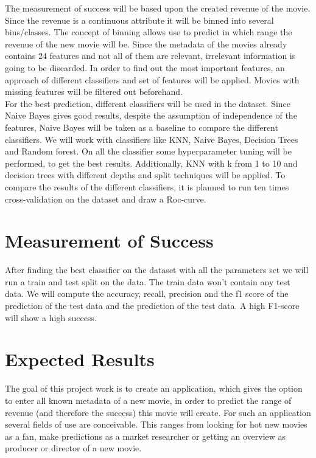 The measurement of success will be based upon the created revenue of the movie. Since the revenue is a continuous attribute it will be binned into several bins/classes. The concept of binning allows use to predict in which range the revenue of the new movie will be.
Since the metadata of the movies already contains 24 features and not all of them are relevant, irrelevant information is going to be discarded. In order to find out the most important features, an approach of different classifiers and set of features will be applied. Movies with missing features will be filtered out beforehand. \\
For the best prediction, different classifiers will be used in the dataset. Since Naive Bayes gives good results, despite the assumption of independence of the features, Naive Bayes will be taken as a baseline to compare the different classifiers. We will work with classifiers like KNN, Naive Bayes, Decision Trees and Random forest. On all the classifier some hyperparameter tuning will be performed, to get the best results. Additionally, KNN with k from 1 to 10 and decision trees with different depths and split techniques will be applied.
To compare the results of the different classifiers, it is planned to run ten times cross-validation on the dataset and draw a Roc-curve.


\section{Measurement of Success}
After finding the best classifier on the dataset with all the parameters set we will run a train and test split on the data. The train data won't contain any test data. We will compute the accuracy, recall, precision and the f1 score of the prediction of the test data and the prediction of the test data. A high F1-score will show a high success.

\section{Expected Results}
The goal of this project work is to create an application, which gives the option to enter all known metadata of a new movie, in order to predict the range of revenue (and therefore the success) this movie will create. For such an application several fields of use are conceivable. This ranges from looking for hot new movies as a fan, make predictions as a market researcher or getting an overview as producer or director of a new movie. 





